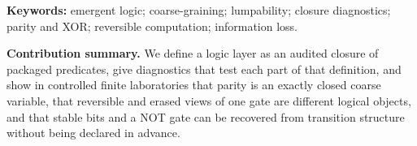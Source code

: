 \noindent\textbf{Keywords:} emergent logic; coarse-graining; lumpability; closure diagnostics; parity and XOR; reversible computation; information loss.

\medskip

\noindent\textbf{Contribution summary.} We define a logic layer as an audited closure of packaged predicates, give diagnostics that test each part of that definition, and show in controlled finite laboratories that parity is an exactly closed coarse variable, that reversible and erased views of one gate are different logical objects, and that stable bits and a NOT gate can be recovered from transition structure without being declared in advance.
